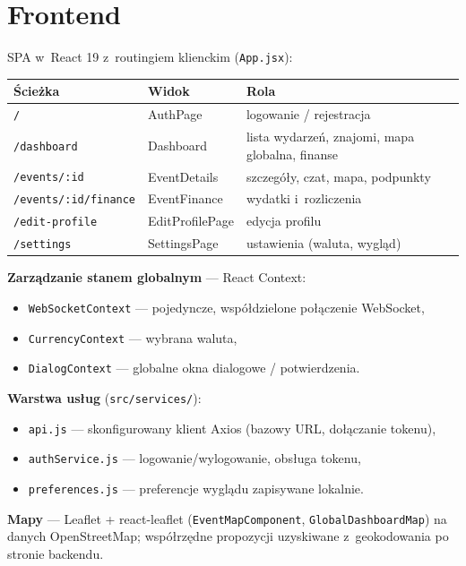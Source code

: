 \documentclass[11pt,a4paper]{article}
\begin{document}
\section{Frontend}

SPA w~React 19 z~routingiem klienckim (\texttt{App.jsx}):

\begin{longtable}{L{4cm} L{3.5cm} L{5.5cm}}
\toprule
\textbf{Ścieżka} & \textbf{Widok} & \textbf{Rola} \\
\midrule
\endhead
\texttt{/} & AuthPage & logowanie / rejestracja \\
\texttt{/dashboard} & Dashboard & lista wydarzeń, znajomi, mapa globalna, finanse \\
\texttt{/events/:id} & EventDetails & szczegóły, czat, mapa, podpunkty \\
\texttt{/events/:id/finance} & EventFinance & wydatki i~rozliczenia \\
\texttt{/edit-profile} & EditProfilePage & edycja profilu \\
\texttt{/settings} & SettingsPage & ustawienia (waluta, wygląd) \\
\bottomrule
\end{longtable}

\textbf{Zarządzanie stanem globalnym} --- React Context:
\begin{itemize}[noitemsep]
    \item \texttt{WebSocketContext} --- pojedyncze, współdzielone połączenie WebSocket,
    \item \texttt{CurrencyContext} --- wybrana waluta,
    \item \texttt{DialogContext} --- globalne okna dialogowe / potwierdzenia.
\end{itemize}

\textbf{Warstwa usług} (\texttt{src/services/}):
\begin{itemize}[noitemsep]
    \item \texttt{api.js} --- skonfigurowany klient Axios (bazowy URL, dołączanie tokenu),
    \item \texttt{authService.js} --- logowanie/wylogowanie, obsługa tokenu,
    \item \texttt{preferences.js} --- preferencje wyglądu zapisywane lokalnie.
\end{itemize}

\textbf{Mapy} --- Leaflet + react-leaflet (\texttt{EventMapComponent},
\texttt{GlobalDashboardMap}) na danych OpenStreetMap; współrzędne propozycji uzyskiwane
z~geokodowania po stronie backendu.
\end{document}
